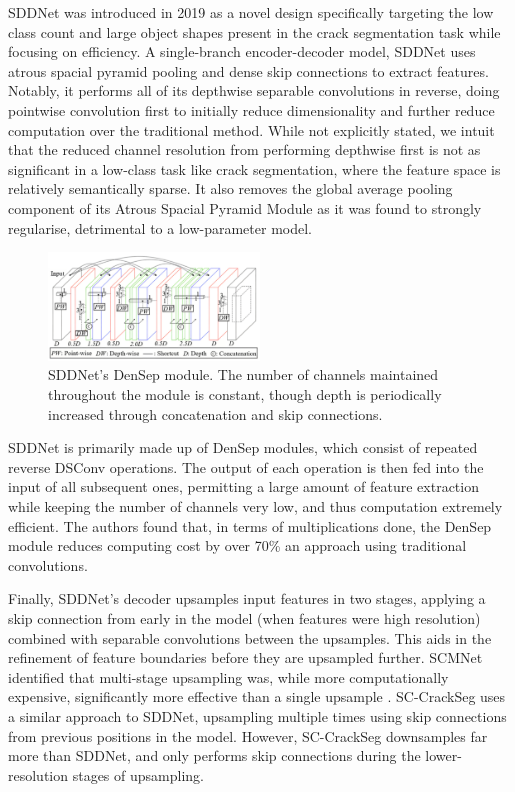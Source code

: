 \documentclass[a4paper,12pt]{report}
\begin{document}
SDDNet was introduced in 2019 as a novel design specifically targeting the low class count and large object shapes present in the crack segmentation task while focusing on efficiency. A single-branch encoder-decoder model, SDDNet uses atrous spacial pyramid pooling and dense skip connections to extract features. Notably, it performs all of its depthwise separable convolutions in reverse, doing pointwise convolution first to initially reduce dimensionality and further reduce computation over the traditional method. While not explicitly stated, we intuit that the reduced channel resolution from performing depthwise first is not as significant in a low-class task like crack segmentation, where the feature space is relatively semantically sparse. It also removes the global average pooling component of its Atrous Spacial Pyramid Module as it was found to strongly regularise, detrimental to a low-parameter model.

\begin{figure}[ht!]
    \centering
    \includegraphics[width=0.5\textwidth]{res/sddnet-densep-module.png}
    \caption{SDDNet's \cite{choi_sddnet_2019} DenSep module. The number of channels maintained throughout the module is constant, though depth is periodically increased through concatenation and skip connections.}
    \label{fig:densep-module}
\end{figure}

SDDNet is primarily made up of DenSep modules, which consist of repeated reverse DSConv operations. The output of each operation is then fed into the input of all subsequent ones, permitting a large amount of feature extraction while keeping the number of channels very low, and thus computation extremely efficient. The authors found that, in terms of multiplications done, the DenSep module reduces computing cost by over 70\% an approach using traditional convolutions.

Finally, SDDNet's decoder upsamples input features in two stages, applying a skip connection from early in the model (when features were high resolution) combined with separable convolutions between the upsamples. This aids in the refinement of feature boundaries before they are upsampled further. SCMNet identified that multi-stage upsampling was, while more computationally expensive, significantly more effective than a single upsample \cite{singha_scmnet_2021}. SC-CrackSeg uses a similar approach to SDDNet, upsampling multiple times using skip connections from previous positions in the model. However, SC-CrackSeg downsamples far more than SDDNet, and only performs skip connections during the lower-resolution stages of upsampling.
\end{document}
